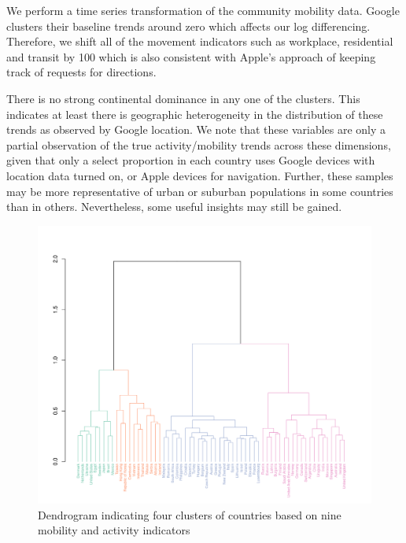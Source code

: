 \documentclass[titlepage,oneside,12pt]{article}
\newcommand{\?}{\stackrel{?}{=}}
\begin{document}
We perform a time series transformation of the community mobility data. Google clusters their baseline trends around zero which affects our log differencing.
Therefore, we shift all of the movement indicators such as workplace, residential and transit by 100 which is also consistent with Apple's approach of keeping track of requests for directions.

There is no strong continental dominance in any one of the clusters.
This indicates at least there is geographic heterogeneity in the distribution of these trends as observed by Google location.
We note that these variables are only a partial observation of the true activity/mobility trends across these dimensions, given that only a select proportion in each country uses Google devices with location data turned on, or Apple devices for navigation.
Further, these samples may be more representative of urban or suburban populations in some countries than in others.
Nevertheless, some useful insights may still be gained.

\begin{figure}[h!]
  \includegraphics[width=\textwidth,trim={0cm 0 1.9cm 7cm},clip]{dendrogram}
  \caption{Dendrogram indicating four clusters of countries based on nine mobility and activity indicators}
  \label{fig:dend}
\end{figure}
\end{document}

